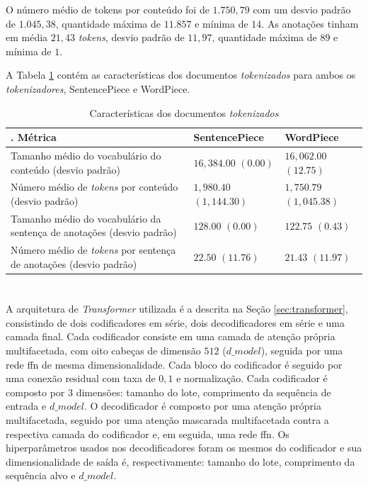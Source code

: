 O número médio de tokens por conteúdo foi de $1.750,79$ com um desvio padrão de $1.045,38$, quantidade máxima de $11.857$ e mínima de $14$. As anotações tinham em média $21,43$ \textit{tokens}, desvio padrão de $11,97$, quantidade máxima de $89$ e mínima de $1$.

A Tabela \ref{table:tokenizer_results} contém as características dos documentos \textit{tokenizados} para ambos os \textit{tokenizadores}, SentencePiece e WordPiece.
\begin{table}[ht!]
    \caption{Características dos documentos \textit{tokenizados}}
    \label{table:tokenizer_results}
    \centering
    \begin{tabular}{
        >{\centering\arraybackslash}m{} | >{\centering\arraybackslash}m{} | >{\centering\arraybackslash}m{}}
        \hline
    .   Métrica & SentencePiece & WordPiece \\ 
        \hline 
        Tamanho médio do vocabulário do conteúdo (desvio padrão) & $16,384.00$ $(0.00)$ & $16,062.00$ $(12.75)$  \\
        \hline
        Número médio de \textit{tokens} por conteúdo (desvio padrão) & $1,980.40$ $(1,144.30)$ & $1,750.79$ $(1,045.38)$ \\
        \hline
        Tamanho médio do vocabulário da sentença de anotações (desvio padrão) & $128.00$ $(0.00)$ & $122.75$ $(0.43)$ \\
        \hline
        Número médio de \textit{tokens} por sentença de anotações (desvio padrão) & $22.50$ $(11.76)$ & $21.43$ $(11.97)$ \\
        \hline
        \end{tabular}
\end{table}

\section{\texorpdfstring{\MakeUppercase{\xfmrxfmr{}}}{}}
\label{sec:results-transformer-transformer}

A arquitetura de \textit{Transformer} utilizada é a descrita na Seção \ref{sec:transformer}, consistindo de dois codificadores em série, dois decodificadores em série e uma camada final. Cada codificador consiste em uma camada de atenção própria multifacetada, com oito cabeças de dimensão $512$ ($d\_model$), seguida por uma rede \gls{ffn} de mesma dimensionalidade. Cada bloco do codificador é seguido por uma conexão residual com taxa de $0,1$ e normalização. Cada codificador é composto por 3 dimensões: tamanho do lote, comprimento da sequência de entrada e $d\_model$. O decodificador é composto por uma atenção própria multifacetada, seguido por uma atenção mascarada multifacetada contra a respectiva camada do codificador e, em seguida, uma rede \gls{ffn}. Os hiperparâmetros usados nos decodificadores foram os mesmos do codificador e sua dimensionalidade de saída é, respectivamente: tamanho do lote, comprimento da sequência alvo e $d\_model$.

